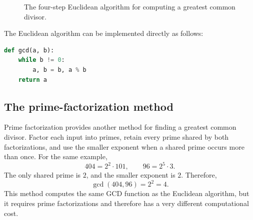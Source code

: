 \documentclass[11pt]{article}
\begin{document}
\begin{figure}[htbp]
  \centering
  \caption{The four-step Euclidean algorithm for computing a greatest common divisor.}
  \label{fig:euclidean-algorithm}
\end{figure}

The Euclidean algorithm can be implemented directly as follows:
\begin{center}
\begin{minipage}{0.67\linewidth}
\begin{lstlisting}[language=Python]
def gcd(a, b):
    while b != 0:
        a, b = b, a % b
    return a
\end{lstlisting}
\end{minipage}
\end{center}

\subsection{The prime-factorization method}

Prime factorization provides another method for finding a greatest common
divisor. Factor each input into primes, retain every prime shared by both
factorizations, and use the smaller exponent when a shared prime occurs more
than once. For the same example,
\[
  404=2^2\cdot101,
  \qquad
  96=2^5\cdot3.
\]
The only shared prime is $2$, and the smaller exponent is $2$. Therefore,
\[
  \gcd(404,96)=2^2=4.
\]
This method computes the same GCD function as the Euclidean algorithm, but it
requires prime factorizations and therefore has a very different computational
cost.
\end{document}
